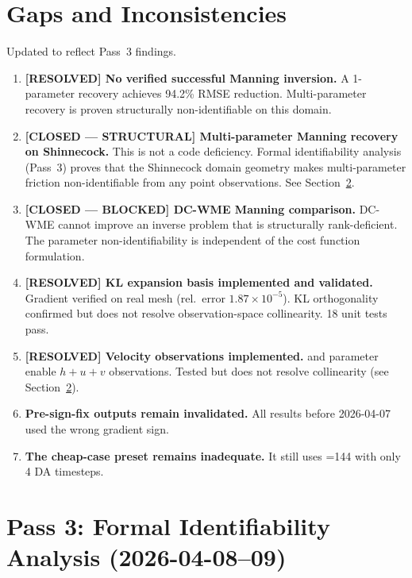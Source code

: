 \documentclass[11pt]{article}
\begin{document}
\section{Gaps and Inconsistencies}
Updated to reflect Pass~3 findings.
\begin{enumerate}
\item \textbf{[RESOLVED] No verified successful Manning inversion.} A 1-parameter recovery achieves 94.2\% RMSE reduction. Multi-parameter recovery is proven structurally non-identifiable on this domain.
\item \textbf{[CLOSED --- STRUCTURAL] Multi-parameter Manning recovery on Shinnecock.} This is not a code deficiency. Formal identifiability analysis (Pass~3) proves that the Shinnecock domain geometry makes multi-parameter friction non-identifiable from any point observations. See Section~\ref{sec:identifiability-analysis}.
\item \textbf{[CLOSED --- BLOCKED] DC-WME Manning comparison.} DC-WME cannot improve an inverse problem that is structurally rank-deficient. The parameter non-identifiability is independent of the cost function formulation.
\item \textbf{[RESOLVED] KL expansion basis implemented and validated.} Gradient verified on real mesh (rel.\ error $1.87\times 10^{-5}$). KL orthogonality confirmed but does not resolve observation-space collinearity. 18 unit tests pass.
\item \textbf{[RESOLVED] Velocity observations implemented.}  and  parameter enable $h{+}u{+}v$ observations. Tested but does not resolve collinearity (see Section~\ref{sec:identifiability-analysis}).
\item \textbf{Pre-sign-fix outputs remain invalidated.} All results before 2026-04-07 used the wrong gradient sign.
\item \textbf{The cheap-case preset remains inadequate.} It still uses =144 with only 4 DA timesteps.
\end{enumerate}

\section{Pass 3: Formal Identifiability Analysis (2026-04-08--09)}
\label{sec:identifiability-analysis}
\end{document}
